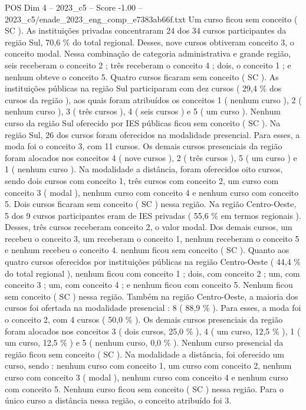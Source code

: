 \begin{textsample}{POS Dim 4 – 2023\_c5 – Score -1.00 – 2023\_c5/enade\_2023\_eng\_comp\_e7383ab66f.txt}
Um curso ficou sem conceito ( SC ).
As instituições privadas concentraram 24 dos 34 cursos participantes da região Sul, 70,6 \% do total regional.
Desses, nove cursos obtiveram conceito 3, o conceito modal.
Nessa combinação de categoria administrativa e grande região, seis receberam o conceito 2 ; três receberam o conceito 4 ; dois, o conceito 1 ; e nenhum obteve o conceito 5.
Quatro cursos ficaram sem conceito ( SC ).
As instituições públicas na região Sul participaram com dez cursos ( 29,4 \% dos cursos da região ), aos quais foram atribuídos os conceitos 1 ( nenhum curso ), 2 ( nenhum curso ), 3 ( três cursos ), 4 ( seis cursos ) e 5 ( um curso ).
Nenhum curso da região Sul oferecido por IES públicas ficou sem conceito ( SC ).
Na região Sul, 26 dos cursos foram oferecidos na modalidade presencial.
Para esses, a moda foi o conceito 3, com 11 cursos.
Os demais cursos presenciais da região foram alocados nos conceitos 4 ( nove cursos ), 2 ( três cursos ), 5 ( um curso ) e 1 ( nenhum curso ).
Na modalidade a distância, foram oferecidos oito cursos, sendo dois cursos com conceito 1, três cursos com conceito 2, um curso com conceito 3 ( modal ), nenhum curso com conceito 4 e nenhum curso com conceito 5.
Dois cursos ficaram sem conceito ( SC ) nessa região.
Na região Centro-Oeste, 5 dos 9 cursos participantes eram de IES privadas ( 55,6 \% em termos regionais ).
Desses, três cursos receberam conceito 2, o valor modal.
Dos demais cursos, um recebeu o conceito 3, um receberam o conceito 1, nenhum receberam o conceito 5 e nenhum recebeu o conceito 4. nenhum ficou sem conceito ( SC ).
Quanto aos quatro cursos oferecidos por instituições públicas na região Centro-Oeste ( 44,4 \% do total regional ), nenhum ficou com conceito 1 ; dois, com conceito 2 ; um, com conceito 3 ; um, com conceito 4 ; e nenhum ficou com conceito 5.
Nenhum ficou sem conceito ( SC ) nessa região.
Também na região Centro-Oeste, a maioria dos cursos foi ofertada na modalidade presencial : 8 ( 88,9 \% ).
Para esses, a moda foi o conceito 2, com 4 cursos ( 50,0 \% ).
Os demais cursos presenciais da região foram alocados nos conceitos 3 ( dois cursos, 25,0 \% ), 4 ( um curso, 12,5 \% ), 1 ( um curso, 12,5 \% ) e 5 ( nenhum curso, 0,0 \% ).
Nenhum curso presencial da região ficou sem conceito ( SC ).
Na modalidade a distância, foi oferecido um curso, sendo : nenhum curso com conceito 1, um curso com conceito 2, nenhum curso com conceito 3 ( modal ), nenhum curso com conceito 4 e nenhum curso com conceito 5.
Nenhum curso ficou sem conceito ( SC ) nessa região.
Para o único curso a distância nessa região, o conceito atribuído foi 3.

\end{textsample}
